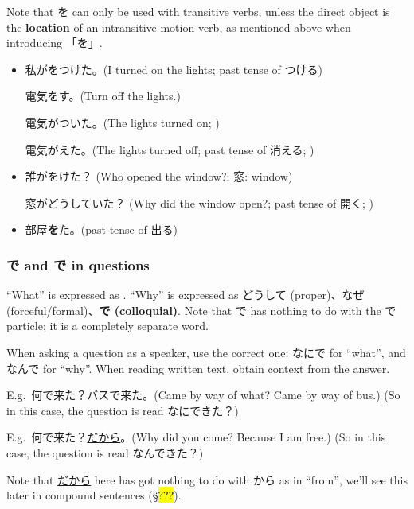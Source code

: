 \documentclass[../nihongo-gakushuu-kyouzai.tex]{subfiles}
\begin{document}
Note that を can only be used with transitive verbs, unless the direct object is the \textbf{location} of an intransitive motion verb, as mentioned above when introducing 「を」.
\begin{itemize}
    \item 私がをつけた。(I turned on the lights; past tense of つける)

    電気をす。(Turn off the lights.)

    電気がついた。(The lights turned on; )

    電気がえた。(The lights turned off; past tense of 消える; )
    \item 誰がをけた？ (Who opened the window?; 窓: window)

    窓がどうしていた？ (Why did the window open?; past tense of 開く; )
    \item 部屋\textbf{を}た。(past tense of 出る)
\end{itemize}

\subsubsection{で and で in questions}
``What'' is expressed as \textbf{}. ``Why'' is expressed as どうして (proper)、なぜ (forceful/formal)、\textbf{で (colloquial)}. Note that で has nothing to do with the で particle; it is a completely separate word.

When asking a question as a speaker, use the correct one: なにで for ``what'', and なんで for ``why''. When reading written text, obtain context from the answer. 

E.g.\ 何で来た？バスで来た。(Came by way of what? Came by  way of bus.) (So in this case, the question is read なにできた？)

E.g.\ 何で来た？\underline{だから}。(Why did you come? Because I am free.) (So in this case, the question is read なんできた？)

Note that \underline{だから} here has got nothing to do with から as in ``from'', we'll see this later in compound sentences (\S\hl{???}).
\end{document}
